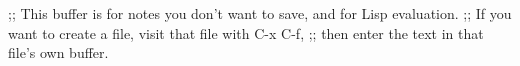 ;; This buffer is for notes you don't want to save, and for Lisp evaluation.
;; If you want to create a file, visit that file with C-x C-f,
;; then enter the text in that file's own buffer.


\begin{frame}[fragile,t]
\frametitle{}
\end{frame}


\begin{itemize}[<+->]
\end{itemize}

{\scriptsize
\begin{verbatim}
\end{verbatim}
}

\begin{columns}[t]
\end{columns}


